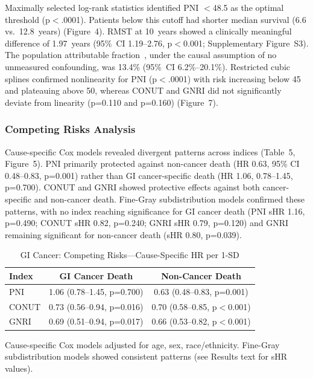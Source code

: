 \documentclass[review]{elsarticle}
\begin{document}
Maximally selected log-rank statistics identified PNI $<$48.5 as the optimal threshold (p$<$.0001). Patients below this cutoff had shorter median survival (6.6 vs.~12.8~years) (Figure~4). RMST at 10~years showed a clinically meaningful difference of 1.97~years (95\%~CI 1.19--2.76, p$<$0.001; Supplementary Figure~S3). The population attributable fraction~\cite{rockhill1998}, under the causal assumption of no unmeasured confounding, was 13.4\% (95\%~CI 6.2\%--20.1\%). Restricted cubic splines confirmed nonlinearity for PNI (p$<$.0001) with risk increasing below 45 and plateauing above 50, whereas CONUT and GNRI did not significantly deviate from linearity (p=0.110 and p=0.160) (Figure~7).

\subsubsection{Competing Risks Analysis}

Cause-specific Cox models revealed divergent patterns across indices (Table~5, Figure~5). PNI primarily protected against non-cancer death (HR 0.63, 95\% CI 0.48--0.83, p=0.001) rather than GI cancer-specific death (HR 1.06, 0.78--1.45, p=0.700). CONUT and GNRI showed protective effects against both cancer-specific and non-cancer death. Fine-Gray subdistribution models confirmed these patterns, with no index reaching significance for GI cancer death (PNI sHR 1.16, p=0.490; CONUT sHR 0.82, p=0.240; GNRI sHR 0.79, p=0.120) and GNRI remaining significant for non-cancer death (sHR 0.80, p=0.039).

\begin{table}[h]
\caption{GI Cancer: Competing Risks---Cause-Specific HR per 1-SD}
\label{tab:gi_competing}
\centering
\begin{tabular}{lcc}
\toprule
Index & GI Cancer Death & Non-Cancer Death \\
\midrule
PNI & 1.06 (0.78--1.45, p=0.700) & 0.63 (0.48--0.83, p=0.001) \\
CONUT & 0.73 (0.56--0.94, p=0.016) & 0.70 (0.58--0.85, p$<$0.001) \\
GNRI & 0.69 (0.51--0.94, p=0.017) & 0.66 (0.53--0.82, p$<$0.001) \\
\bottomrule
\end{tabular}
\par\footnotesize Cause-specific Cox models adjusted for age, sex, race/ethnicity. Fine-Gray subdistribution models showed consistent patterns (see Results text for sHR values).
\end{table}
\end{document}
